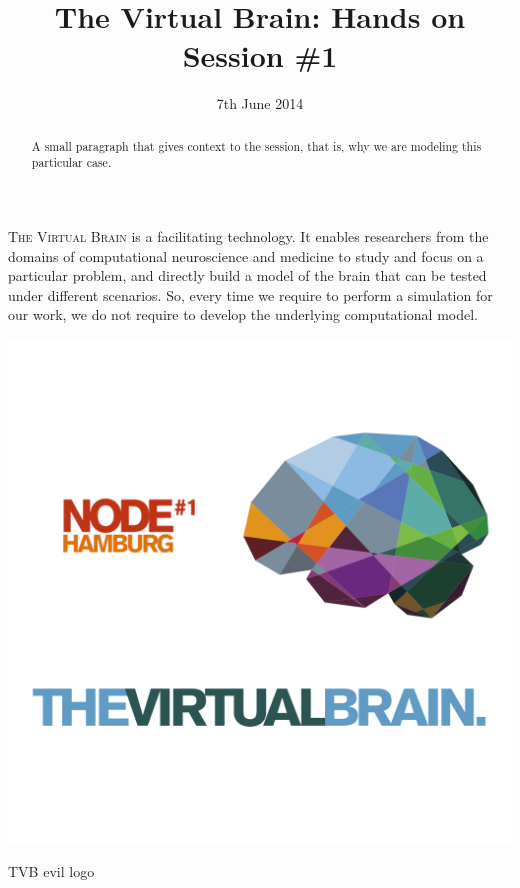 \documentclass{tufte-handout}
\title{The Virtual Brain: Hands on Session \#1}
\date{7th June 2014}
\begin{document}
\maketitle %

\begin{abstract}
\noindent A small paragraph that gives context to the session, that is, 
why we are modeling this particular case.
\end{abstract}


\textsc{The Virtual Brain}  is a facilitating technology. It enables
researchers from the domains of  computational neuroscience and medicine to
study and focus on a particular problem, and directly build a model of the
brain that can be tested under different scenarios. So, every time we require
to perform a simulation for our work, we do not require to develop the
underlying computational model.   
\begin{marginfigure}%
  \includegraphics[width=\linewidth]{tvb_logo_transparent_square}
  \caption{TVB evil logo}
  \label{fig:marginfig}
\end{marginfigure}
\end{document}
